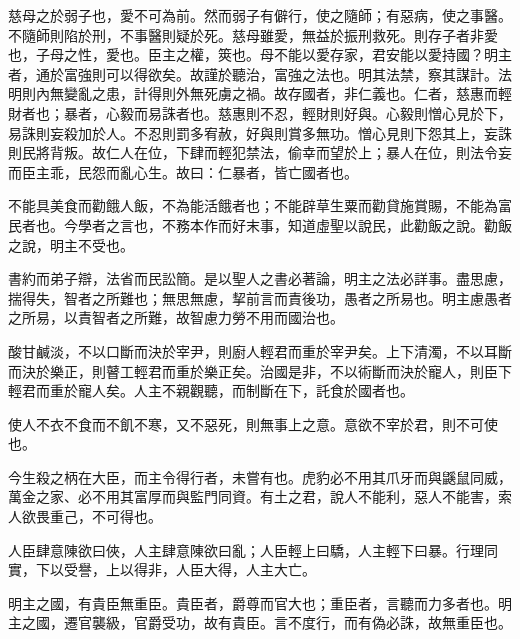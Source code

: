 \begin{pinyinscope}
慈母之於弱子也，愛不可為前。然而弱子有僻行，使之隨師；有惡病，使之事醫。不隨師則陷於刑，不事醫則疑於死。慈母雖愛，無益於振刑救死。則存子者非愛也，子母之性，愛也。臣主之權，筴也。母不能以愛存家，君安能以愛持國？明主者，通於富強則可以得欲矣。故謹於聽治，富強之法也。明其法禁，察其謀計。法明則內無變亂之患，計得則外無死虜之禍。故存國者，非仁義也。仁者，慈惠而輕財者也；暴者，心毅而易誅者也。慈惠則不忍，輕財則好與。心毅則憎心見於下，易誅則妄殺加於人。不忍則罰多宥赦，好與則賞多無功。憎心見則下怨其上，妄誅則民將背叛。故仁人在位，下肆而輕犯禁法，偷幸而望於上；暴人在位，則法令妄而臣主乖，民怨而亂心生。故曰：仁暴者，皆亡國者也。

不能具美食而勸餓人飯，不為能活餓者也；不能辟草生粟而勸貸施賞賜，不能為富民者也。今學者之言也，不務本作而好末事，知道虛聖以說民，此勸飯之說。勸飯之說，明主不受也。

書約而弟子辯，法省而民訟簡。是以聖人之書必著論，明主之法必詳事。盡思慮，揣得失，智者之所難也；無思無慮，挈前言而責後功，愚者之所易也。明主慮愚者之所易，以責智者之所難，故智慮力勞不用而國治也。

酸甘鹹淡，不以口斷而決於宰尹，則廚人輕君而重於宰尹矣。上下清濁，不以耳斷而決於樂正，則瞽工輕君而重於樂正矣。治國是非，不以術斷而決於寵人，則臣下輕君而重於寵人矣。人主不親觀聽，而制斷在下，託食於國者也。

使人不衣不食而不飢不寒，又不惡死，則無事上之意。意欲不宰於君，則不可使也。

今生殺之柄在大臣，而主令得行者，未嘗有也。虎豹必不用其爪牙而與鼷鼠同威，萬金之家、必不用其富厚而與監門同資。有土之君，說人不能利，惡人不能害，索人欲畏重己，不可得也。

人臣肆意陳欲曰俠，人主肆意陳欲曰亂；人臣輕上曰驕，人主輕下曰暴。行理同實，下以受譽，上以得非，人臣大得，人主大亡。

明主之國，有貴臣無重臣。貴臣者，爵尊而官大也；重臣者，言聽而力多者也。明主之國，遷官襲級，官爵受功，故有貴臣。言不度行，而有偽必誅，故無重臣也。


\end{pinyinscope}